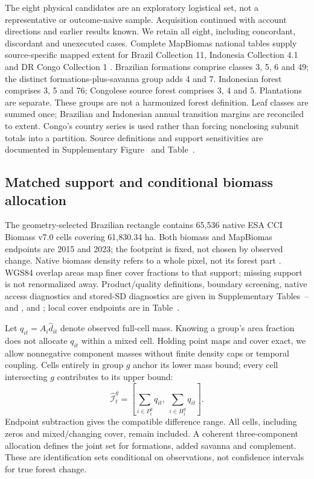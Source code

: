 \documentclass[11pt,a4paper]{article}
\begin{document}
The eight physical candidates are an exploratory logistical set, not a representative or outcome-naive sample. Acquisition continued with account directions and earlier results known. We retain all eight, including concordant, discordant and unexecuted cases. Complete MapBiomas national tables supply source-specific mapped extent for Brazil Collection 11, Indonesia Collection 4.1 and DR Congo Collection 1 \citep{MapBiomas2026,MapBiomasIDN2026,MapBiomasCOD2026}. Brazilian formations comprise classes 3, 5, 6 and 49; the distinct formations-plus-savanna group adds 4 and 7. Indonesian forest comprises 3, 5 and 76; Congolese source forest comprises 3, 4 and 5. Plantations are separate. These groups are not a harmonized forest definition. Leaf classes are summed once; Brazilian and Indonesian annual transition margins are reconciled to extent. Congo's country series is used rather than forcing nonclosing subunit totals into a partition. Source definitions and support sensitivities are documented in Supplementary Figure~ and Table~.

\subsection{Matched support and conditional biomass allocation}
The geometry-selected Brazilian rectangle contains 65,536 native ESA CCI Biomass v7.0 cells covering 61,830.34 ha. Both biomass and MapBiomas endpoints are 2015 and 2023; the footprint is fixed, not chosen by observed change. Native biomass density refers to a whole pixel, not its forest part \citep{SantoroCartus2026,PUG2026}. WGS84 overlap areas map finer cover fractions to that support; missing support is not renormalized away. Product/quality definitions, boundary screening, native access diagnostics and stored-SD diagnostics are given in Supplementary Tables~-- and ,  and ; local cover endpoints are in Table~.

Let $q_{it}=A_i\widehat d_{it}$ denote observed full-cell mass. Knowing a group's area fraction does not allocate $q_{it}$ within a mixed cell. Holding point maps and cover exact, we allow nonnegative component masses without finite density caps or temporal coupling. Cells entirely in group $g$ anchor its lower mass bound; every cell intersecting $g$ contributes to its upper bound:
\begin{equation}
\widehat{\mathcal I}_t^g=\left[\sum_{i\in P_t^g}q_{it},\ \sum_{i\in H_t^g}q_{it}\right].\label{eq:allocationmain}
\end{equation}
Endpoint subtraction gives the compatible difference range. All cells, including zeros and mixed/changing cover, remain included. A coherent three-component allocation defines the joint set for formations, added savanna and complement. These are identification sets conditional on observations, not confidence intervals for true forest change.
\end{document}
